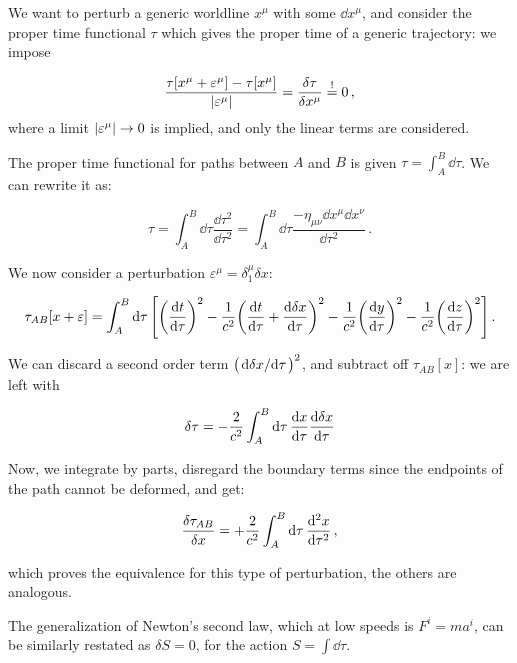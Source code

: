 \documentclass[main.tex]{subfiles}
\begin{document}
We want to perturb a generic  worldline \(x^{\mu}\) with some \(\dd{x^{\mu}}\), and consider the proper time functional \(\tau\) which gives the proper time of a generic trajectory: we impose

\begin{equation}
  \frac{\tau \qty[x^{\mu} + \varepsilon^\mu] - \tau \qty[x^{\mu}]}{\abs{\varepsilon ^\mu} } = \frac{\delta \tau}{\delta x^\mu} \overset{!}{=}  0\,,
\end{equation}
%
where a limit \(\abs{\varepsilon^{\mu}} \rightarrow 0 \) is implied, and only the linear terms are considered.

The proper time functional for paths between \(A\) and \(B\) is given \(\tau = \int _A^B \dd{\tau}\).  
We can rewrite it as:

\begin{equation}
  \tau = \int_A^B \dd{\tau} \frac{\dd{\tau^2}}{\dd{\tau^2}}
  = \int_A^B \dd{\tau} \frac{-\eta_{\mu \nu}\dd{x^{\mu} \dd{x^{\nu}}}}{\dd{\tau^2}}\,.
\end{equation}

We now consider a perturbation \(\varepsilon^{\mu} = \delta^{\mu}_1 \delta x\):

\begin{equation}
  \tau_{AB}[x + \varepsilon] = \int_A^B \dd{\tau}
  \qty[\qty(\dv{t}{\tau})^2 
  - \frac{1}{c^{2}} \qty(\dv{t}{\tau} + \dv{\delta x}{\tau})^2 
  - \frac{1}{c^{2}} \qty(\dv{y}{\tau})^2
  - \frac{1}{c^{2}} \qty(\dv{z}{\tau})^2]\,.
\end{equation}

We can discard a second order term \(\qty(\dv*{\delta x}{\tau})^2\), and subtract off \(\tau_{AB}[x]\): we are left with 

\begin{equation}
  \delta \tau = - \frac{2}{c^{2}} \int_A^B \dd{\tau} \dv{x}{\tau} \dv{\delta x}{\tau} 
\end{equation}

Now, we integrate by parts, disregard the boundary terms since the endpoints of the path cannot be deformed, and get:

\begin{equation}
  \frac{\delta \tau_{AB}}{\delta x} = + \frac{2}{c^{2}} \int_A^B \dd{\tau} \dv[2]{x}{\tau} \,,
\end{equation}

which proves the equivalence for this type of perturbation, the others are analogous.

The generalization of Newton's second law, which at low speeds is \(F^{i} = m a^{i}\), can be similarly restated as \(\delta S = 0\), for the action \(S = \int \dd{\tau}\).
\end{document}
